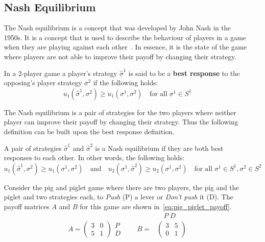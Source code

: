 \subsection{Nash Equilibrium}\label{sec:game_intro_nash_equilibrium}

The Nash equilibrium is a concept that was developed by John Nash in the
1950s.
It is a concept that is used to describe the behaviour of players in a
game when they are playing against each other~\cite{kreps1989nash}.
In essence, it is the state of the game where players are not able to improve
their payoff by changing their strategy.

\begin{definition}
In a 2-player game a player's strategy \(\hat{\sigma}^1\) is said to be a
\textbf{best response} to the opposing's player strategy \(\sigma^2\) if the
following holds:
\begin{equation}\label{eq:best_response}
    u_1(\hat{\sigma}^1,\sigma^2) \geq u_1(\sigma^1,\sigma^2) \quad
    \text{for all } \sigma^1 \in S^1
\end{equation}
\end{definition}

The Nash equilibrium is a pair of strategies for the two players where neither
player can improve their payoff by changing their strategy.
Thus the following definition can be built upon the best response definition.

\begin{definition}
A pair of strategies \(\hat{\sigma}^1\) and \(\hat{\sigma}^2\) is a Nash
equilibrium if they are both best responses to each other.
In other words, the following holds:
\begin{equation}\label{eq:nash_equilibrium}
    u_1(\hat{\sigma}^1,\sigma^2) \geq u_1(\sigma^1,\sigma^2)
    \quad \text{and} \quad
    u_2(\sigma^1, \hat{\sigma}^2) \geq u_2(\sigma^1,\sigma^2)
    \quad \text{for all } \sigma^1 \in S^1, \sigma^2 \in S^2
\end{equation}
\end{definition}

Consider the pig and piglet game where there are two players, the pig and the
piglet and two strategies each, to \textit{Push} (P) a lever or
\textit{Don't push} it (D).
The payoff matrices \(A\) and \(B\) for this game are shown
in~\eqref{eq:pig_piglet_payoff}.
\begin{align}
    & \quad P \; D \nonumber \\
    A =
    \begin{pmatrix}
        3 & 0 \\
        5 & 1
    \end{pmatrix}
    \begin{matrix}
        P \\
        D
    \end{matrix} \qquad
    B =&
    \begin{pmatrix}
        3 & 5 \\
        0 & 1
    \end{pmatrix}
    \label{eq:pig_piglet_payoff}
\end{align}

